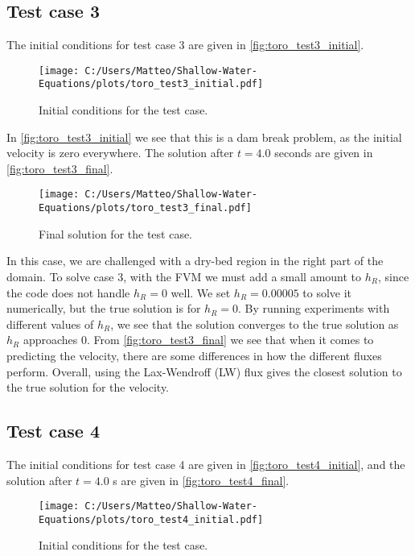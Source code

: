 \subsection*{Test case 3}
The initial conditions for test case 3 are given in \autoref{fig:toro_test3_initial}.
\begin{figure}[H]
    \centering
    \texttt{[image: C:/Users/Matteo/Shallow-Water-Equations/plots/toro\_test3\_initial.pdf]}
    \caption{Initial conditions for the test case.}\label{fig:toro_test3_initial}
\end{figure}
In \autoref{fig:toro_test3_initial} we see that this is a dam break problem, as the initial velocity is zero everywhere.
The solution after $t=4.0$ seconds are given in \autoref{fig:toro_test3_final}.
\begin{figure}[H]
    \centering
    \texttt{[image: C:/Users/Matteo/Shallow-Water-Equations/plots/toro\_test3\_final.pdf]}
    \caption{Final solution for the test case.}\label{fig:toro_test3_final}
\end{figure}
In this case, we are challenged with a dry-bed region in the right part of the domain.
To solve case 3, with the FVM we must add a small amount to $h_R$, since the code does not handle $h_R = 0$ well.
We set $h_R = 0.00005$ to solve it numerically, but the true solution is for $h_R = 0$.
By running experiments with different values of $h_R$, we see that the solution converges to the true solution as $h_R$ approaches 0.
From \autoref{fig:toro_test3_final} we see that when it comes to predicting the velocity, there are some differences in how the different fluxes perform.
Overall, using the Lax-Wendroff (LW) flux gives the closest solution to the true solution for the velocity.

\subsection*{Test case 4}
The initial conditions for test case 4 are given in \autoref{fig:toro_test4_initial}, and the solution after $t=4.0$ s are given in \autoref{fig:toro_test4_final}.
\begin{figure}[H]
    \centering
    \texttt{[image: C:/Users/Matteo/Shallow-Water-Equations/plots/toro\_test4\_initial.pdf]}
    \caption{Initial conditions for the test case.}\label{fig:toro_test4_initial}
\end{figure}

